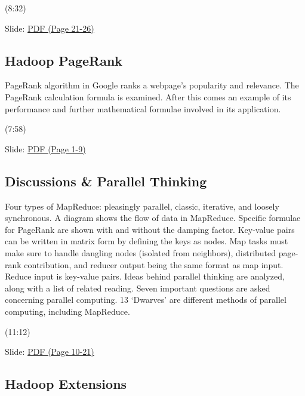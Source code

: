   (8:32)





  Slide:
  \href{https://drive.google.com/open?id=0B88HKpainTSfYWZ0dDlrNThkVms}{PDF
  (Page 21-26)}


\subsection{Hadoop PageRank}

PageRank algorithm in Google ranks a webpage's popularity and relevance.
The PageRank calculation formula is examined. After this comes an
example of its performance and further mathematical formulae involved in
its application.




  (7:58)

  Slide:
  \href{https://drive.google.com/open?id=0B88HKpainTSfWFpEZGxqSWRTYms}{PDF
  (Page 1-9)}


\subsection{Discussions \& Parallel
Thinking}

Four types of MapReduce: pleasingly parallel, classic, iterative, and
loosely synchronous. A diagram shows the flow of data in MapReduce.
Specific formulae for PageRank are shown with and without the damping
factor. Key-value pairs can be written in matrix form by defining the
keys as nodes. Map tasks must make sure to handle dangling nodes
(isolated from neighbors), distributed page-rank contribution, and
reducer output being the same format as map input. Reduce input is
key-value pairs. Ideas behind parallel thinking are analyzed, along with
a list of related reading. Seven important questions are asked
concerning parallel computing. 13 `Dwarves' are different methods of
parallel computing, including MapReduce.




  (11:12)





  Slide:
  \href{https://drive.google.com/open?id=0B88HKpainTSfWFpEZGxqSWRTYms}{PDF
  (Page 10-21)}


\subsection{Hadoop Extensions}

